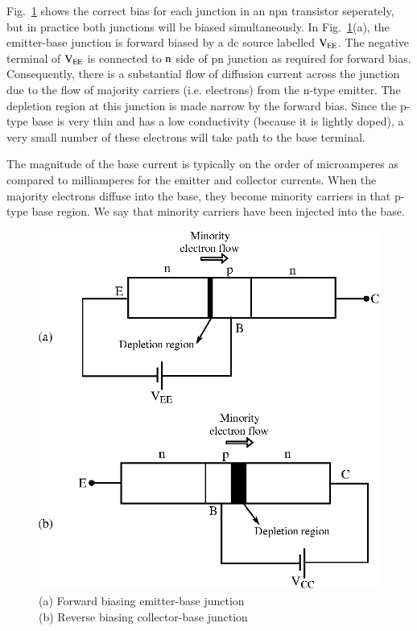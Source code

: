 Fig.~\ref{fig2.3} shows the correct bias for each junction in an npn transistor seperately, but in practice both junctions will be biased simultaneously. In Fig.~\ref{fig2.3}(a), the emitter-base junction is forward biased by a dc source labelled $\textrm{V}_{\textrm{E}\textrm{E}}$. The negative terminal of $\textrm{V}_{\textrm{E}\textrm{E}}$ is connected to $\textrm{n}$ side of pn junction as required for forward bias. Consequently, there is a substantial flow of diffusion current across the junction due to the flow of majority carriers (i.e. electrons) from the n-type emitter. The depletion region at this junction is made narrow by the forward bias. Since the p-type base is very thin and has a low conductivity (because it is lightly doped), a very small number of these electrons will take path to the base terminal.

The magnitude of the base current is typically on the order of microamperes as compared to milliamperes for the emitter and collector currents. When the majority electrons diffuse into the base, they become minority carriers in that p-type base region. We say that minority carriers have been injected into the base.
\begin{figure}[H]
\centering
\includegraphics[scale=.95]{chap2/fig3.eps}
\caption{(a) Forward biasing emitter-base junction\\ (b) Reverse biasing collector-base junction}\label{fig2.3}
\end{figure}

